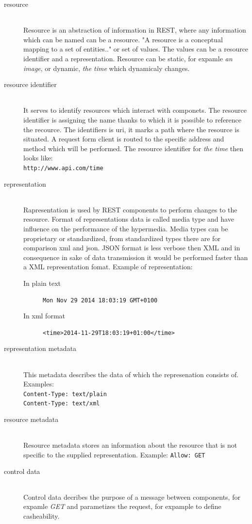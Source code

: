 \begin{description}
  \item [resource] \hfill \\ 
  Resource is an abstraction of information in REST, where any information which can be named can be a resource. "A resource is a conceptual mapping to a set of entities.." \cite{fielding} or set of values. The values can be a resource identifier and a representation.
  Resource can be static, for expamle \emph{an image}, or dynamic, \emph{the time} which dynamicaly changes.
  \item [resource identifier] \hfill \\
  It serves to identify resources which interact with componets. The resource identifier is assigning the name thanks to which it is possible to reference the recource. The identifiers is \gls{uri}, it marks a path where the resource is situated. A request form client is routed to the specific address and method which will be performed.
  The resource identifier for \emph{the time} then looks like: \hfill \\
  \texttt{http://www.api.com/time}
  \item [representation] \hfill \\
  Rapresentation is used by REST components to perform changes to the resource. Format of representations data is called media type and have influence on the performance of the hypermedia. Media types can be proprietary or standardized, from standardized types there are for comparison \gls{xml} and \gls{json}. JSON format is less verbose then XML and in consequence in sake of data transmission it would be performed faster than a XML representation fomat.
  Example of representation:
  \begin{description}
    \item[In plain text] \texttt{Mon Nov 29 2014 18:03:19 GMT+0100}
    \item[In xml format] \texttt{<time>2014-11-29T18:03:19+01:00</time>}
  \end{description}
  \item [representation metadata] \hfill \\
  This metadata describes the data of which the represenation consists of.
  Examples: \hfill \\
  \texttt{Content-Type: text/plain} \hfill \\
  \texttt{Content-Type: text/xml}
   \item [resource metadata] \hfill \\
  Resource metadata stores an information about the resource that is not specific to the supplied representation.
  Example: \texttt{Allow: GET}
  \item [control data] \hfill \\
  Control data decribes the purpose of a message between components, for expamle \emph{GET} and parametizes the request, for expample to define casheability. 
\end{description}

